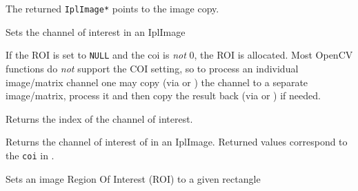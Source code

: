 The returned \texttt{IplImage*} points to the image copy.

\label{SetImageCOI}

Sets the channel of interest in an IplImage


\begin{description}
\end{description}

If the ROI is set to \texttt{NULL} and the coi is \textit{not} 0, the ROI is allocated. Most OpenCV functions do \textit{not} support the COI setting, so to process an individual image/matrix channel one may copy (via  or ) the channel to a separate image/matrix, process it and then copy the result back (via  or ) if needed.

\label{GetImageCOI}

Returns the index of the channel of interest. 


\begin{description}
\end{description}

Returns the channel of interest of in an IplImage. Returned values correspond to the \texttt{coi} in .

\label{SetImageROI}

Sets an image Region Of Interest (ROI) to a given rectangle


\begin{description}
\end{description}

